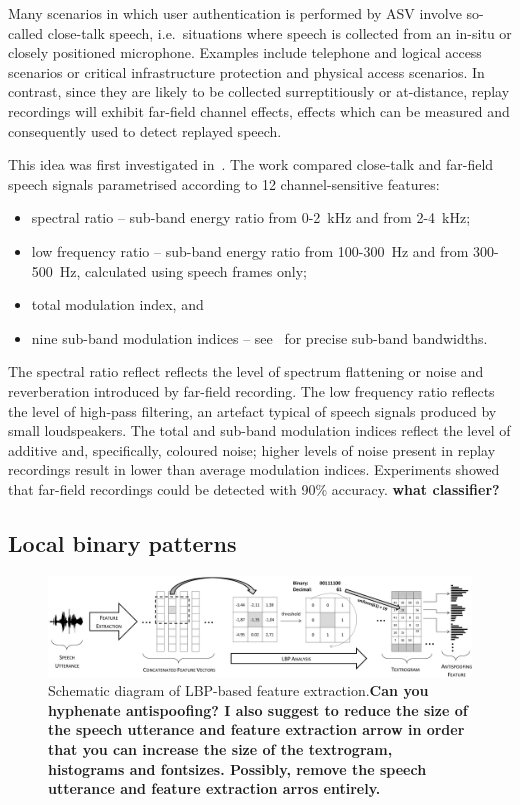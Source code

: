 Many scenarios in which user authentication is performed by ASV involve so-called close-talk speech, i.e.\ situations where speech is collected from an in-situ or closely positioned microphone.  Examples include telephone and logical access scenarios or critical infrastructure protection and physical access scenarios.  In contrast, since they are likely to be collected surreptitiously or at-distance, replay recordings will exhibit far-field channel effects, effects which can be measured and consequently used to detect replayed speech.  

This idea was first investigated in~\cite{Villalba2011}.  The work compared close-talk and far-field speech signals parametrised according to 12 channel-sensitive features:


\begin{itemize}
\item spectral ratio -- sub-band energy ratio from 0-2~kHz and from 2-4~kHz; 
\item low frequency ratio -- sub-band energy ratio from 100-300~Hz and from 300-500~Hz, calculated using speech frames only;
\item total modulation index, and
\item nine sub-band modulation indices -- see~\cite{Villalba2011} for precise sub-band bandwidths.
\end{itemize}


The spectral ratio reflect reflects the level of spectrum flattening or noise and reverberation introduced by far-field recording.  The low frequency ratio reflects the level of high-pass filtering, an artefact typical of speech signals  produced by small loudspeakers.  The total and sub-band modulation indices reflect the level of additive and, specifically, coloured noise; higher levels of noise present in replay recordings result in lower than average modulation indices.  Experiments showed that far-field recordings could be detected with 90\%  accuracy.  {\bfseries what classifier?}



\subsection{Local binary patterns}


\begin{figure}
	\includegraphics[width=1\linewidth]{Figs/LBPfeature.pdf}
	\caption{Schematic diagram of LBP-based feature extraction.{\bfseries Can you hyphenate antispoofing?  I also suggest to reduce the size of the speech utterance and feature extraction arrow in order that you can increase the size of the textrogram, histograms and fontsizes.  Possibly, remove the speech utterance and feature extraction arros entirely.}}
	\label{fig:LBPfeature}
\end{figure}


